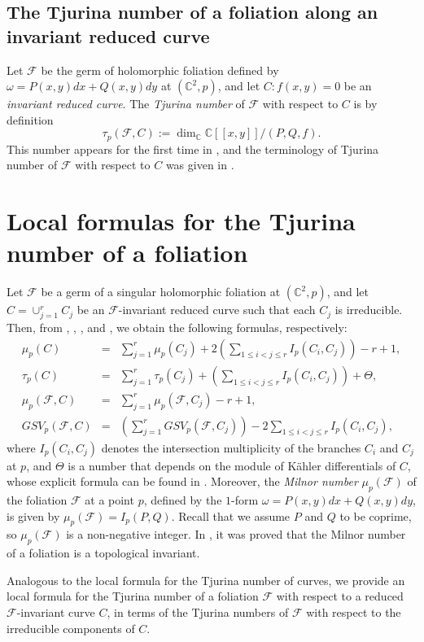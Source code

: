 \documentclass[11pt]{amsart}
\newcommand{\C}{\mathbb{C}}
\newcommand{\F}{\mathcal{F}}
\begin{document}
\subsection{The Tjurina number of a foliation along an invariant reduced curve}
Let $\F$ be the germ of holomorphic foliation defined by $\omega=P(x,y)dx+Q(x,y)dy$ at $(\C^2,p)$, and let $C: f(x,y)=0$ be an \textit{invariant reduced curve}. The \textit{Tjurina number} of $\F$ with respect to $C$ is by definition 
\[\tau_p(\F, C):=\dim_{\C}\C[[x,y]]/(P,Q,f).\]
This number appears for the first time in \cite{Gomez}, and the terminology of Tjurina number of $\F$ with respect to  $C$ was given in \cite[p. 159]{Cano}.

\section{Local formulas for the Tjurina number of a foliation}
Let $\F$ be a germ of a singular holomorphic foliation at $(\C^2,p)$, and let $C=\cup_{j=1}^{r}C_j$ be an $\F$-invariant reduced curve such that each $C_j$ is irreducible. Then, from \cite[Theorem 6.5.1]{Wall},  \cite[Proposition 3.2]{H-H}, \cite[Equation (2.2), p. 329]{K-S}, and \cite[p. 29]{Brunella-book}, we obtain the following formulas, respectively:
\begin{eqnarray}
\mu_p(C)&=&\sum_{j=1}^{r}\mu_p(C_j)+2\left(\sum_{1\leq i<j\leq r}I_p(C_i,C_j)\right)-r+1\label{eq_2},\\
\tau_p(C)&=&\sum_{j=1}^{r}\tau_p(C_j)+\left(\sum_{1\leq i<j\leq r}I_p(C_i,C_j)\right)+\Theta\label{eq_tjurina},\\
\mu_p(\F,C)&=&\sum_{j=1}^{r}\mu_p(\F,C_j)-r+1\label{eq_3},\\
GSV_p(\F,C)&=&\left(\sum_{j=1}^{r}GSV_p(\F,C_j)\right)-2\sum_{1\leq i<j\leq r}I_p(C_i,C_j),\label{eq_4}
\end{eqnarray}
where $I_p(C_i,C_j)$ denotes the intersection multiplicity of the branches $C_i$ and $C_j$ at $p$, and $\Theta$ is a number that depends on the module of K\"ahler differentials of $C$, whose explicit formula can be found in \cite[Theorem 5.1]{H-H}. Moreover, the \textit{Milnor number} $\mu_{p}(\F)$ of the foliation $\F$ at a point $p$, defined by the $1$-form $\omega=P(x,y)dx+Q(x,y)dy$, is given by 
$\mu_p(\F)=I_p(P,Q).$
Recall that we assume $P$ and $Q$ to be coprime, so $\mu_p(\F)$ is a non-negative integer. In \cite[Theorem A]{CLS}, it was proved that the Milnor number of a foliation is  a topological invariant. 

\par Analogous to the local formula for the Tjurina number of curves, we provide an local formula for the Tjurina number of a foliation $\F$ with respect to a reduced $\F$-invariant curve $C$, in terms of the Tjurina numbers of $\F$ with respect to the irreducible components of $C$.
\end{document}
